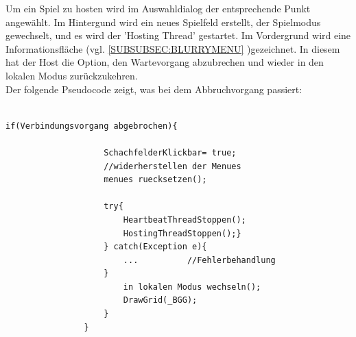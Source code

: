 \documentclass[12pt,a4paper]{article}
\begin{document}
Um ein Spiel zu hosten wird im Auswahldialog der entsprechende Punkt angewählt. 
Im Hintergund wird ein neues Spielfeld erstellt, der Spielmodus gewechselt, und es wird der 'Hosting Thread' gestartet.
Im Vordergrund wird eine Informationsfläche (vgl. \ref{SUBSUBSEC:BLURRYMENU} )gezeichnet. In diesem hat der Host die Option, den Wartevorgang abzubrechen und wieder in den lokalen Modus zurückzukehren. \\
Der folgende Pseudocode zeigt, was bei dem Abbruchvorgang passiert: 
\lstset{language=java}
\begin{lstlisting}

if(Verbindungsvorgang abgebrochen){

					SchachfelderKlickbar= true; 
					//widerherstellen der Menues
					menues ruecksetzen();		
						
					try{	
						HeartbeatThreadStoppen();
						HostingThreadStoppen();}
					} catch(Exception e){
						...			 //Fehlerbehandlung
					}
						in lokalen Modus wechseln();
						DrawGrid(_BGG);
					}
				}

\end{lstlisting}
\end{document}
